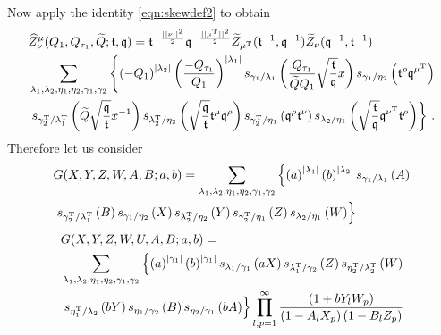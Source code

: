\documentclass[main.tex]{subfiles}
\begin{document}
Now apply the identity \eqref{eqn:skewdef2} to obtain
\begin{equation}
\begin{aligned}
&\widehat{Z}^{\mu}_{\nu}(Q_1,Q_{\tau_1},\widetilde{Q};\mathfrak{t},\mathfrak{q})=\mathfrak{t}^{-\frac{||\nu||^2}{2}}\mathfrak{q}^{-\frac{||\mu^{\operatorname{T}}||^2}{2}}\widetilde{Z}_{\mu^{\operatorname{T}}}(\mathfrak{t}^{-1},\mathfrak{q}^{-1})\widetilde{Z}_{\nu}(\mathfrak{q}^{-1},\mathfrak{t}^{-1})\\
&\sum_{\lambda_1,\lambda_2,\eta_1,\eta_2,\gamma_1,\gamma_2}\left\{\left(-Q_1\right)^{|\lambda_2|}\left(\frac{-Q_{\tau_1}}{Q_1}\right)^{|\lambda_1|}s_{\gamma_1/\lambda_1}\left(\frac{Q_{\tau_1}}{\widetilde{Q}Q_1}\sqrt{\frac{\mathfrak{t}}{\mathfrak{q}}}x\right)s_{\gamma_1/\eta_2}\left(\mathfrak{t}^{\rho}\mathfrak{q}^{\mu^{\operatorname{T}}}\right)\right.\\
&\left.s_{\gamma^{\operatorname{T}}_2/\lambda_1^{\operatorname{T}}}\left(\widetilde{Q}\sqrt{\frac{\mathfrak{q}}{\mathfrak{t}}}x^{-1}\right)s_{\lambda_2^{\operatorname{T}}/\eta_2}\left(\sqrt{\frac{\mathfrak{q}}{\mathfrak{t}}}\mathfrak{t}^{\mu}\mathfrak{q}^{\rho}\right)s_{\gamma_2^{\operatorname{T}}/\eta_1}\left(\mathfrak{q}^{\rho}\mathfrak{t}^{\nu}\right)s_{\lambda_2/\eta_1}\left(\sqrt{\frac{\mathfrak{t}}{\mathfrak{q}}}\mathfrak{q}^{\nu^{\operatorname{T}}}\mathfrak{t}^{\rho}\right)\right\}\,.
\end{aligned}
\end{equation}
Therefore let us consider
\begin{equation}
\begin{aligned}
&G(X,Y,Z,W,A,B;a,b)=\sum_{\lambda_1,\lambda_2,\eta_1,\eta_2,\gamma_1,\gamma_2}\left\{\left(a\right)^{|\lambda_1|}\left(b\right)^{|\lambda_2|}s_{\gamma_1/\lambda_1}\left(A\right)\right.\\
&\left.s_{\gamma^{\operatorname{T}}_2/\lambda_1^{\operatorname{T}}}\left(B\right)s_{\gamma_1/\eta_2}\left(X\right)s_{\lambda_2^{\operatorname{T}}/\eta_2}\left(Y\right)s_{\gamma_2^{\operatorname{T}}/\eta_1}\left(Z\right)s_{\lambda_2/\eta_1}\left(W\right)\right\}
\end{aligned}
\end{equation}
\begin{equation}\label{eqn:step1p}
\begin{aligned}
&G(X,Y,Z,W,U,A,B;a,b)=\\
&\sum_{\lambda_1,\lambda_2,\eta_1,\eta_2,\gamma_1,\gamma_2}\left\{\left(a\right)^{|\gamma_1|}\left(b\right)^{|\gamma_1|}s_{\lambda_1/\gamma_1}\left(aX\right)s_{\lambda_1^{\operatorname{T}}/\gamma_2}\left(Z\right)s_{\eta_2^{\operatorname{T}}/\lambda_2^{\operatorname{T}}}\left(W\right)\right.\\
&\left.s_{\eta_1^{\operatorname{T}}/\lambda_2}\left(bY\right)s_{\eta_1/\gamma_2}\left(B\right)s_{\eta_2/\gamma_1}\left(bA\right)\right\}\prod_{l,p=1}^{\infty}\frac{\left(1+bY_lW_p\right)}{\left(1-A_lX_p\right)\left(1-B_lZ_p\right)}
\end{aligned}
\end{equation}
\end{document}
